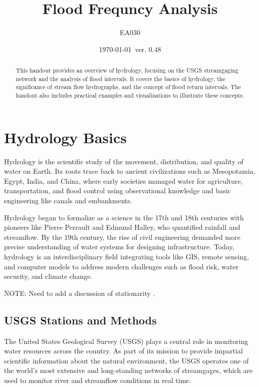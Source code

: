 \documentclass{tufte-handout}\usepackage[]{graphicx}\usepackage[]{xcolor}
\title{Flood Frequncy Analysis}
\author{EA030}
\date{\today~ver. 0.48}
\begin{document}
\maketitle%
\begin{abstract}
\noindent 
This handout provides an overview of hydrology, focusing on the USGS streamgaging network and the analysis of flood intervals. It covers the basics of hydrology, the significance of stream flow hydrographs, and the concept of flood return intervals. The handout also includes practical examples and visualizations to illustrate these concepts.
\end{abstract}



\section{Hydrology Basics}

Hydrology is the scientific study of the movement, distribution, and quality of water on Earth. Its roots trace back to ancient civilizations such as Mesopotamia, Egypt, India, and China, where early societies managed water for agriculture, transportation, and flood control using observational knowledge and basic engineering like canals and embankments.

Hydrology began to formalize as a science in the 17th and 18th centuries with pioneers like Pierre Perrault and Edmund Halley, who quantified rainfall and streamflow. By the 19th century, the rise of civil engineering demanded more precise understanding of water systems for designing infrastructure. Today, hydrology is an interdisciplinary field integrating tools like GIS, remote sensing, and computer models to address modern challenges such as flood risk, water security, and climate change.

NOTE: Need to add a discussion of stationarity \citep{merz2021causes,shao2024research, pielke2009collateral}.

\subsection{USGS Stations and Methods}

The United States Geological Survey (USGS) plays a central role in monitoring water resources across the country. As part of its mission to provide impartial scientific information about the natural environment, the USGS operates one of the world’s most extensive and long-standing networks of streamgages, which are used to monitor river and streamflow conditions in real time.
\end{document}
